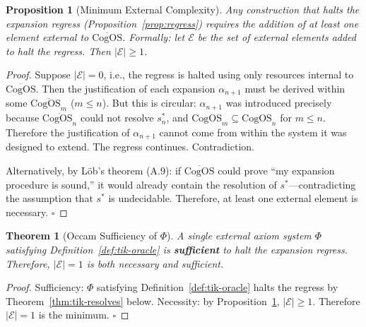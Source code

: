 \documentclass[11pt]{article}
\newtheorem{theorem}{Theorem}
\newtheorem{proposition}{Proposition}
\newcommand{\CogOS}{\text{CogOS}}
\begin{document}
\begin{proposition}[Minimum External Complexity]
\label{prop:occam}
Any construction that halts the expansion regress
(Proposition~\ref{prop:regress}) requires the addition of at least one
element external to $\overline{\CogOS}$. Formally: let $\mathcal{E}$ be the
set of external elements added to halt the regress. Then
$|\mathcal{E}| \geq 1$.
\end{proposition}

\begin{proof}
Suppose $|\mathcal{E}| = 0$, i.e., the regress is halted using only
resources internal to $\overline{\CogOS}$. Then the justification of each
expansion $\alpha_{n+1}$ must be derived within some $\overline{\CogOS_m}$
($m \leq n$). But this is circular: $\alpha_{n+1}$ was introduced precisely
because $\overline{\CogOS_n}$ could not resolve $s_n^*$, and $\CogOS_m
\subseteq \CogOS_n$ for $m \leq n$. Therefore the justification of
$\alpha_{n+1}$ cannot come from within the system it was designed to extend.
The regress continues. Contradiction.

Alternatively, by L\"{o}b's theorem (A.9): if $\overline{\CogOS}$ could
prove ``my expansion procedure is sound,'' it would already contain the
resolution of $s^*$---contradicting the assumption that $s^*$ is undecidable.
Therefore, at least one external element is necessary. \hfill $\square$
\end{proof}

\begin{theorem}[Occam Sufficiency of $\Phi$]
\label{thm:occam}
A single external axiom system $\Phi$ satisfying
Definition~\ref{def:tik-oracle} is \textbf{sufficient} to halt the expansion
regress. Therefore, $|\mathcal{E}| = 1$ is both necessary and sufficient.
\end{theorem}

\begin{proof}
Sufficiency: $\Phi$ satisfying Definition~\ref{def:tik-oracle} halts the
regress by Theorem~\ref{thm:tik-resolves} below. Necessity: by
Proposition~\ref{prop:occam}, $|\mathcal{E}| \geq 1$. Therefore
$|\mathcal{E}| = 1$ is the minimum. \hfill $\square$
\end{proof}
\end{document}
